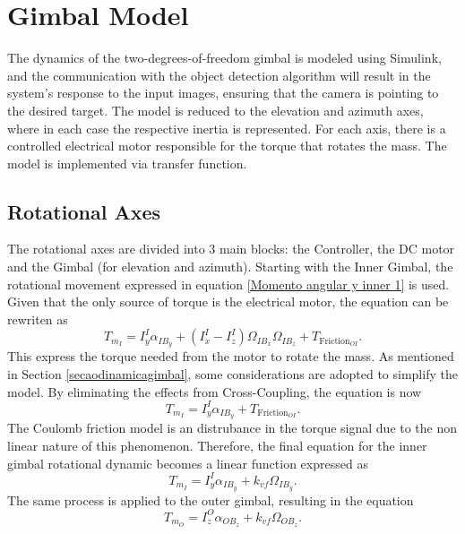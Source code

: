 \section{Gimbal Model}
The dynamics of the two-degrees-of-freedom gimbal is modeled using Simulink, and the communication with the object detection algorithm will result in the system's response to the input images, ensuring that the camera is pointing to the desired target. The model is reduced to the elevation and azimuth axes, where in each case the respective inertia is represented. For each axis, there is a controlled electrical motor responsible for the torque that rotates the mass. The model is implemented via transfer function. 

\subsection{Rotational Axes}
\label{secaorotationalaxes}
The rotational axes are divided into 3 main blocks: the Controller, the DC motor and the Gimbal (for elevation and azimuth). Starting with the Inner Gimbal, the rotational movement expressed in equation \eqref{Momento angular y inner 1} is used. Given that the only source of torque is the electrical motor, the equation can be rewriten as
\begin{equation}
   \label{Momento angular y inner 1}
   T_{m_I} = I^I_y \alpha_{IB_y} + (I^I_x - I^I_z) \Omega_{IB_x} \Omega_{IB_z} + T_{\text{Friction}_{OI}}.
\end{equation}
This express the torque needed from the motor to rotate the mass. As mentioned in Section \ref{secaodinamicagimbal}, some considerations are adopted to simplify the model. By eliminating the effects from Cross-Coupling, the equation is now
\begin{equation}
   T_{m_I} = I^I_y \alpha_{IB_y} + T_{\text{Friction}_{OI}}.
\end{equation}
The Coulomb friction model is an distrubance in the torque signal due to the non linear nature of this phenomenon. Therefore, the final equation for the inner gimbal rotational dynamic becomes a linear function expressed as
\begin{equation}
   \label{Momento angular y inner reduced}
   T_{m_I} = I^I_y \alpha_{IB_y} + k_{vf}\Omega_{IB_y}.
\end{equation}
The same process is applied to the outer gimbal, resulting in the equation
\begin{equation}
	\label{momento angular z outer}
T_{m_O} = I^O_z \alpha_{{OB}_z} + k_{vf}\Omega_{OB_z}.
\end{equation}
